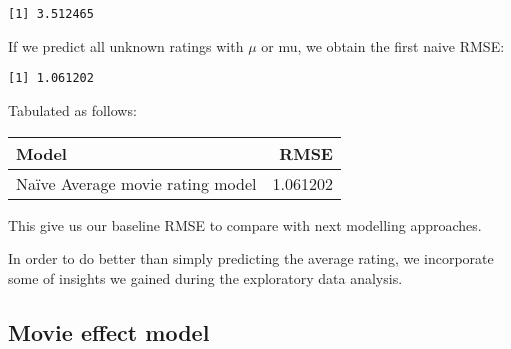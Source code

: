 \documentclass[
]{article}
\newenvironment{Shaded}{\begin{snugshade}}{\end{snugshade}}
\newcommand{\CommentTok}[1]{\textcolor[rgb]{0.00,0.40,1.00}{\textbf{\textit{#1}}}}
\newcommand{\DataTypeTok}[1]{\textcolor[rgb]{0.74,0.68,0.62}{\underline{#1}}}
\newcommand{\KeywordTok}[1]{\textcolor[rgb]{0.26,0.66,0.93}{\textbf{#1}}}
\newcommand{\NormalTok}[1]{\textcolor[rgb]{0.74,0.68,0.62}{#1}}
\newcommand{\OperatorTok}[1]{\textcolor[rgb]{0.74,0.68,0.62}{#1}}
\newcommand{\StringTok}[1]{\textcolor[rgb]{0.02,0.61,0.04}{#1}}
\begin{document}
\begin{Shaded}
\end{Shaded}

\begin{verbatim}
[1] 3.512465
\end{verbatim}

If we predict all unknown ratings with \(\mu\) or mu, we obtain the
first naive RMSE:

\begin{Shaded}
\end{Shaded}

\begin{verbatim}
[1] 1.061202
\end{verbatim}

\pagebreak

Tabulated as follows:

\begin{Shaded}
\end{Shaded}

\begin{longtable}[]{@{}lr@{}}
\toprule
Model & RMSE\tabularnewline
\midrule
\endhead
Naïve Average movie rating model & 1.061202\tabularnewline
\bottomrule
\end{longtable}

This give us our baseline RMSE to compare with next modelling
approaches.

In order to do better than simply predicting the average rating, we
incorporate some of insights we gained during the exploratory data
analysis.

\hypertarget{movie-effect-model}{%
\subsection{Movie effect model}\label{movie-effect-model}}
\end{document}
